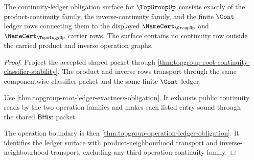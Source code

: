 \begin{theorem}
\label{thm:topgroup-obligation-continuity-ledger-surface}
The continuity-ledger obligation surface for $\TopGroupUp$ consists exactly of
the product-continuity family, the inverse-continuity family, and the finite
$\Cont$ ledger rows connecting them to the displayed $\NameCert_{\GroupUp}$ and
$\NameCert_{\TopologyUp}$ carrier rows. The surface contains no continuity row
outside the carried product and inverse operation graphs.
\end{theorem}
\begin{proof}
Project the accepted shared packet through
\autoref{thm:topgroup-root-continuity-classifier-stability}. The product and
inverse rows transport through the same componentwise classifier packet and the
same finite $\Cont$ ledger.

Use \autoref{thm:topgroup-root-ledger-exactness-obligation}. It exhausts public
continuity reads by the two operation families and makes each listed entry
sound through the shared $\mathsf{BHist}$ packet.

The operation boundary is then
\autoref{thm:topgroup-operation-ledger-obligation}. It identifies the ledger
surface with product-neighbourhood transport and inverse-neighbourhood
transport, excluding any third operation-continuity family.
\end{proof}

